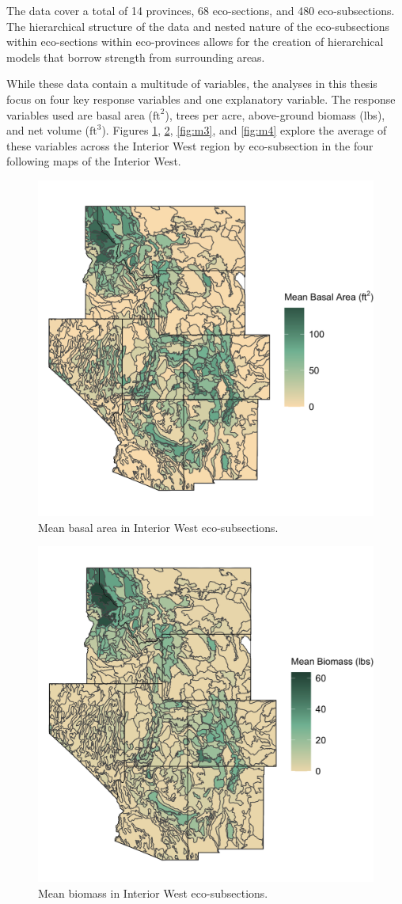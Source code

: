 \documentclass[12pt,twoside]{reedthesis}
\begin{document}
The data cover a total of 14 provinces, 68 eco-sections, and 480 eco-subsections. The hierarchical structure of the data and nested nature of the eco-subsections within eco-sections within eco-provinces allows for the creation of hierarchical models that borrow strength from surrounding areas.

While these data contain a multitude of variables, the analyses in this thesis focus on four key response variables and one explanatory variable. The response variables used are basal area (\(\text{ft}^2\)), trees per acre, above-ground biomass (lbs), and net volume (\(\text{ft}^3\)). Figures \ref{fig:m1}, \ref{fig:m2}, \ref{fig:m3}, and \ref{fig:m4} explore the average of these variables across the Interior West region by eco-subsection in the four following maps of the Interior West.
\clearpage
\begin{figure}

{\centering \includegraphics[width=0.65\linewidth]{figure/basal_new} 

}

\caption[Mean basal area in Interior West eco-subsections]{Mean basal area in Interior West eco-subsections.}\label{fig:m1}
\end{figure}
\begin{figure}

{\centering \includegraphics[width=0.65\linewidth]{figure/biomass_new} 

}

\caption[Mean biomass in Interior West eco-subsections]{Mean biomass in Interior West eco-subsections.}\label{fig:m2}
\end{figure}
\end{document}
